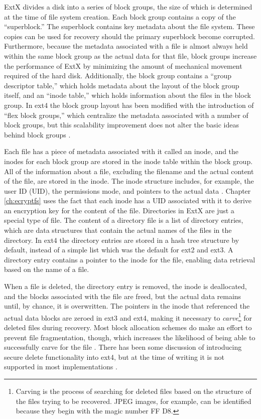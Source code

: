 ExtX divides a disk into a series of block groups, the size of which is determined at the time of file system creation.  Each block
group contains a copy of the ``superblock.'' The superblock contains key metadata about the file system.  These copies can be used
for recovery should the primary superblock become corrupted.  Furthermore, because the metadata associated with a file is almost
always held within the same block group as the actual data for that file, block groups increase the performance of ExtX by
minimizing the amount of mechanical movement required of the hard disk. Additionally, the block group contains a ``group descriptor
table,'' which holds metadata about the layout of the block group itself, and an ``inode table,'' which holds information about the
files in the block group. In ext4 the block group layout has been modified with the introduction of ``flex block groups,'' which
centralize the metadata associated with a number of block groups, but this scalability improvement does not alter the basic ideas
behind block groups \cite{ext4implications}.

Each file has a piece of metadata associated with it called an inode, and the inodes for each block group are stored in the inode
table within the block group. All of the information about a file, excluding the filename and the actual content of the file, are
stored in the inode. The inode structure includes, for example, the user ID (UID), the permissions mode, and pointers to the actual
data \cite[p.  457]{carrier}. Chapter \ref{ch:ecryptfs} uses the fact that each inode has a UID associated with it to derive an
encryption key for the content of the file. Directories in ExtX are just a special type of file. The content of a directory file
is a list of directory entries, which are data structures that contain the actual names of the files in the directory. In ext4 the
directory entries are stored in a hash tree structure by default, instead of a simple list which was the default for ext2 and ext3.
A directory entry contains a pointer to the inode for the file, enabling data retrieval based on the name of a file. 

When a file is deleted, the directory entry is removed, the inode is deallocated, and the blocks associated with the file are freed,
but the actual data remains until, by chance, it is overwritten. The pointers in the inode that referenced the actual
data blocks are zeroed in ext3 and ext4, making it necessary to \emph{carve}\footnote{Carving is the process of searching
for deleted files based on the structure of the files trying to be recovered. JPEG images, for example, can be identified because
they begin with the magic number FF D8.} for deleted files during recovery.  Most block allocation schemes do make an effort to
prevent file fragmentation, though, which increases the likelihood of being able to successfully carve for the file
\cite{ext4implications}. There has been some discussion of introducing secure delete functionality into ext4, but at the
time of writing it is not supported in most implementations \cite{ext4securedelete}.


